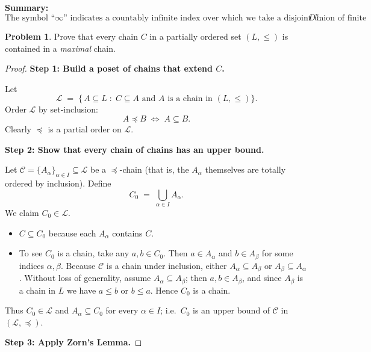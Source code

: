 \documentclass[12pt]{article}
\theoremstyle{definition} %
\newtheorem{problem}{Problem}
\theoremstyle{plain} %
\begin{document}
\bigskip
\textbf{Summary:}
\[
   \boxed{
     \text{The symbol ``\(\infty\)'' indicates a countably infinite index over which we take a disjoint union 
           of finite products }D^n.
   }
\]
\begin{problem}
    Prove that every chain \(C\) in a partially ordered set \((L,\le)\)
    is contained in a \emph{maximal} chain.
\end{problem}

\begin{proof}
    \textbf{Step 1:  Build a poset of chains that extend \(C\).}

    Let
    \[
        \mathcal L
        \;=\;
        \bigl\{\,A\subseteq L \;:\; C\subseteq A
              \text{ and } A \text{ is a chain in }(L,\le)\bigr\}.
    \]
    Order \(\mathcal L\) by set‑inclusion:
    \[
        A\preceq B \;\Longleftrightarrow\; A\subseteq B.
    \]
    Clearly \(\preceq\) is a partial order on \(\mathcal L\).

    \bigskip
    \textbf{Step 2:  Show that every chain of chains has an upper bound.}

    Let \(\mathcal C=\{A_{\alpha}\}_{\alpha\in I}\subseteq\mathcal L\)
    be a \(\preceq\)-chain (that is, the \(A_{\alpha}\) themselves are
    totally ordered by inclusion).
    Define
    \[
        C_{0}\;=\;\bigcup_{\alpha\in I} A_{\alpha}.
    \]
    We claim \(C_{0}\in\mathcal L\).

    \begin{itemize}
        \item \(C\subseteq C_{0}\) because each \(A_{\alpha}\) contains \(C\).
        \item To see \(C_{0}\) is a chain, take any \(a,b\in C_{0}\).
              Then \(a\in A_{\alpha}\) and \(b\in A_{\beta}\) for some
              indices \(\alpha,\beta\).
              Because \(\mathcal C\) is a chain under inclusion, either
              \(A_{\alpha}\subseteq A_{\beta}\) or
              \(A_{\beta}\subseteq A_{\alpha}\).
              Without loss of generality, assume
              \(A_{\alpha}\subseteq A_{\beta}\); then
              \(a,b\in A_{\beta}\), and since \(A_{\beta}\) is a chain in
              \(L\) we have \(a\le b\) or \(b\le a\).
              Hence \(C_{0}\) is a chain.
    \end{itemize}
    Thus \(C_{0}\in\mathcal L\) and \(A_{\alpha}\subseteq C_{0}\)
    for every \(\alpha\in I\); i.e.\ \(C_{0}\) is an upper bound of
    \(\mathcal C\) in \((\mathcal L,\preceq)\).

    \bigskip
    \textbf{Step 3:  Apply Zorn's Lemma.}


\end{proof}
\end{document}
